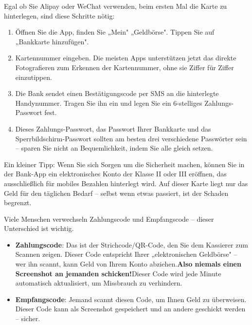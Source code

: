 


Egal ob Sie Alipay oder WeChat verwenden, beim ersten Mal die Karte zu hinterlegen, sind diese Schritte nötig:

\begin{enumerate}
  \item Öffnen Sie die App, finden Sie „Mein" „Geldbörse". Tippen Sie auf „Bankkarte hinzufügen".
  \item Kartennummer eingeben. Die meisten Apps unterstützen jetzt das direkte Fotografieren zum Erkennen der Kartennummer, ohne sie Ziffer für Ziffer einzutippen.
  \item Die Bank sendet einen Bestätigungscode per SMS an die hinterlegte Handynummer. Tragen Sie ihn ein und legen Sie ein 6-stelliges Zahlungs-Passwort fest.
  \item Dieses Zahlungs-Passwort, das Passwort Ihrer Bankkarte und das Sperrbildschirm-Passwort sollten am besten drei verschiedene Passwörter sein – sparen Sie nicht an Bequemlichkeit, indem Sie alle gleich setzen.
\end{enumerate}

Ein kleiner Tipp: Wenn Sie sich Sorgen um die Sicherheit machen, können Sie in der Bank-App ein elektronisches Konto der Klasse II oder III eröffnen, das ausschließlich für mobiles Bezahlen hinterlegt wird. Auf dieser Karte liegt nur das Geld für den täglichen Bedarf – selbst wenn etwas passiert, ist der Schaden begrenzt.


Viele Menschen verwechseln Zahlungscode und Empfangscode – dieser Unterschied ist wichtig.

\begin{itemize}
  \item \textbf{Zahlungscode}: Das ist der Strichcode/QR-Code, den Sie dem Kassierer zum Scannen zeigen. Dieser Code entspricht Ihrer „elektronischen Geldbörse" – wer ihn scannt, kann Geld von Ihrem Konto abziehen.\textbf{Also niemals einen Screenshot an jemanden schicken!}Dieser Code wird jede Minute automatisch aktualisiert, um Missbrauch zu verhindern.
  \item \textbf{Empfangscode}: Jemand scannt diesen Code, um Ihnen Geld zu überweisen. Dieser Code kann als Screenshot gespeichert und an andere geschickt werden – sicher.
\end{itemize}

